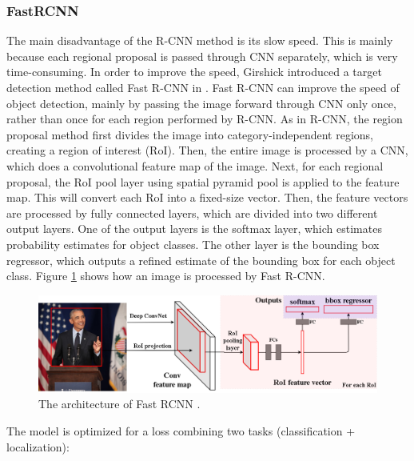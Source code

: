 \subsubsection{FastRCNN}
The main disadvantage of the R-CNN method is its slow speed. This is mainly because each regional proposal is passed through CNN separately, which is very time-consuming. In order to improve the speed, Girshick introduced a target detection method called Fast R-CNN in \cite{DBLP:journals/corr/Girshick15}. Fast R-CNN can improve the speed of object detection, mainly by passing the image forward through CNN only once, rather than once for each region performed by R-CNN. As in R-CNN, the region proposal method first divides the image into category-independent regions, creating a region of interest (RoI). Then, the entire image is processed by a CNN, which does a convolutional feature map of the image. Next, for each regional proposal, the RoI pool layer using spatial pyramid pool \cite{DBLP:journals/corr/HeZR014} is applied to the feature map. This will convert each RoI into a fixed-size vector. Then, the feature vectors are processed by fully connected layers, which are divided into two different output layers. One of the output layers is the softmax layer, which estimates probability estimates for object classes. The other layer is the bounding box regressor, which outputs a refined estimate of the bounding box for each object class. Figure \ref{fig:fastArc} shows how an image is processed by Fast R-CNN.
\begin{figure}[ht!]
	\centerline{\includegraphics[width=1\linewidth]{Figs/fastArc.png}}
	\caption{The architecture of Fast RCNN \cite{DBLP:journals/corr/Girshick15}.}
	\label{fig:fastArc}
\end{figure}
The model is optimized for a loss combining two tasks (classification + localization):
